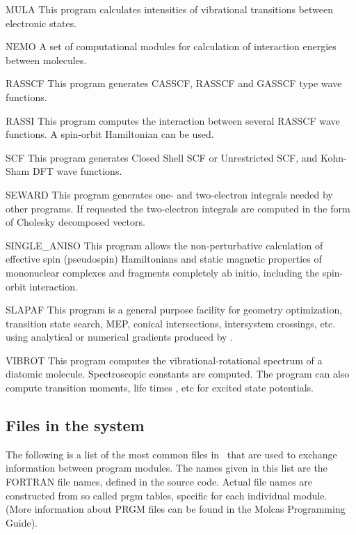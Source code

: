 \begin{programlist}
\item[MULA]
This program calculates intensities of vibrational
transitions between electronic states.
\item[NEMO]
A set of computational modules for calculation of
interaction energies between molecules.
\item[RASSCF]
This program generates CASSCF, RASSCF and GASSCF type wave functions.
\item[RASSI]
This program computes the interaction between several RASSCF
wave functions. A spin-orbit Hamiltonian can be used.
\item[SCF]
This program generates Closed Shell SCF or Unrestricted SCF,
and Kohn-Sham DFT wave functions.
\item[SEWARD]
This program generates one-{} and two-{}electron integrals needed
by other programs. If requested the two-electron integrals are
computed in the form of Cholesky decomposed vectors.
\item[SINGLE\_ANISO]
This program allows the non-perturbative
 calculation of effective spin (pseudospin) Hamiltonians
 and static magnetic properties of mononuclear complexes
 and fragments completely ab initio, including the
 spin-orbit interaction.
\item[SLAPAF]
This program is a general purpose facility for geometry
optimization, transition state search, MEP, conical intersections, intersystem
crossings, etc. using analytical or numerical gradients produced by
.
\item[VIBROT]
This program computes the vibrational-{}rotational spectrum of a
diatomic molecule. Spectroscopic constants are computed. The program can also
compute transition moments, life times , etc for excited state potentials.
\end{programlist}

\subsection{Files in the system}
\label{UG:sec:files_list}

The following is a list of the most common files in \molcas\ that are used
to exchange information between program modules. The names given in
this list are the FORTRAN file names, defined in the source code.
Actual file names are constructed from so called prgm tables, specific
for each individual module. (More information about PRGM files can be found
in the Molcas Programming Guide).

